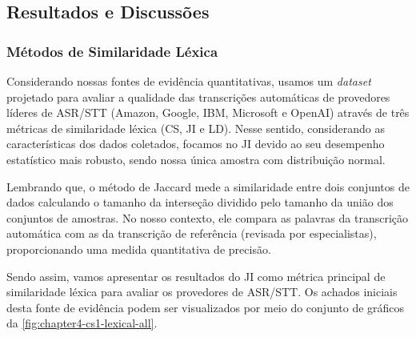 \subsection{Resultados e Discussões}

\subsubsection{Métodos de Similaridade Léxica}

Considerando nossas fontes de evidência quantitativas, usamos um \textit{dataset} projetado para avaliar a qualidade das transcrições automáticas de provedores líderes de ASR/STT (Amazon, Google, IBM, Microsoft e OpenAI) através de três métricas de similaridade léxica (CS, JI e LD). Nesse sentido, considerando as características dos dados coletados, focamos no JI devido ao seu desempenho estatístico mais robusto, sendo nossa única amostra com distribuição normal.

Lembrando que, o método de Jaccard mede a similaridade entre dois conjuntos de dados calculando o tamanho da interseção dividido pelo tamanho da união dos conjuntos de amostras. No nosso contexto, ele compara as palavras da transcrição automática com as da transcrição de referência (revisada por especialistas), proporcionando uma medida quantitativa de precisão. 

Sendo assim, vamos apresentar os resultados do JI como métrica principal de similaridade léxica para avaliar os provedores de ASR/STT. Os achados iniciais desta fonte de evidência podem ser visualizados por meio do conjunto de gráficos da \autoref{fig:chapter4-cs1-lexical-all}.


